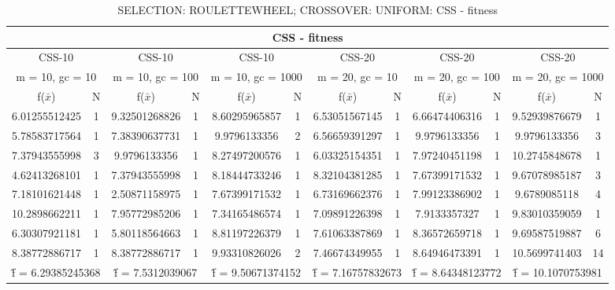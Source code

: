 \begin{table}[H]
	\centering
	\caption{SELECTION: ROULETTEWHEEL; CROSSOVER: UNIFORM: CSS - fitness}
	\begin{adjustbox}{width=1\textwidth}
		\begin{tabular}{ |c|c||c|c||c|c||c|c||c|c||c|c| }
			\hline
			\multicolumn{12}{|c|}{CSS - fitness} \\
			\hline
			\multicolumn{2}{|c||}{CSS-10} & \multicolumn{2}{c||}{CSS-10} & \multicolumn{2}{c||}{CSS-10} & \multicolumn{2}{c||}{CSS-20} & \multicolumn{2}{c||}{CSS-20} & \multicolumn{2}{c|}{CSS-20}\\
			\hline
			\multicolumn{2}{|c||}{m = 10, gc = 10} & \multicolumn{2}{c||}{m = 10, gc = 100} & \multicolumn{2}{c||}{m = 10, gc = 1000} & \multicolumn{2}{c||}{m = 20, gc = 10} & \multicolumn{2}{c||}{m = 20, gc = 100} & \multicolumn{2}{c|}{m = 20, gc = 1000}\\
			\hline
			f($\bar{x}$) & N & f($\bar{x}$) & N & f($\bar{x}$) & N & f($\bar{x}$) & N & f($\bar{x}$) & N & f($\bar{x}$) & N\\
			\hline
			\hline
			6.01255512425 & 1 & 9.32501268826 & 1 & 8.60295965857 & 1 & 6.53051567145 & 1 & 6.66474406316 & 1 & 9.52939876679 & 1\\
			5.78583717564 & 1 & 7.38390637731 & 1 & 9.9796133356 & 2 & 6.56659391297 & 1 & 9.9796133356 & 1 & 9.9796133356 & 3\\
			7.37943555998 & 3 & 9.9796133356 & 1 & 8.27497200576 & 1 & 6.03325154351 & 1 & 7.97240451198 & 1 & 10.2745848678 & 1\\
			4.62413268101 & 1 & 7.37943555998 & 1 & 8.18444733246 & 1 & 8.32104381285 & 1 & 7.67399171532 & 1 & 9.67078985187 & 3\\
			7.18101621448 & 1 & 2.50871158975 & 1 & 7.67399171532 & 1 & 6.73169662376 & 1 & 7.99123386902 & 1 & 9.6789085118 & 4\\
			10.2898662211 & 1 & 7.95772985206 & 1 & 7.34165486574 & 1 & 7.09891226398 & 1 & 7.9133357327 & 1 & 9.83010359059 & 1\\
			6.30307921181 & 1 & 5.80118564663 & 1 & 8.81197226379 & 1 & 7.61063387869 & 1 & 8.36572659718 & 1 & 9.69587519887 & 6\\
			8.38772886717 & 1 & 8.38772886717 & 1 & 9.93310826026 & 2 & 7.46674349955 & 1 & 8.64946473391 & 1 & 10.5699741403 & 14\\
			\hline
			\multicolumn{2}{|c||}{\^{f} = 6.29385245368} & \multicolumn{2}{c||}{\^{f} = 7.5312039067} & \multicolumn{2}{c||}{\^{f} = 9.50671374152} & \multicolumn{2}{c||}{\^{f} = 7.16757832673} & \multicolumn{2}{c||}{\^{f} = 8.64348123772} & \multicolumn{2}{c|}{\^{f} = 10.1070753981}\\
			\hline
		\end{tabular}
	\end{adjustbox}
\end{table}
